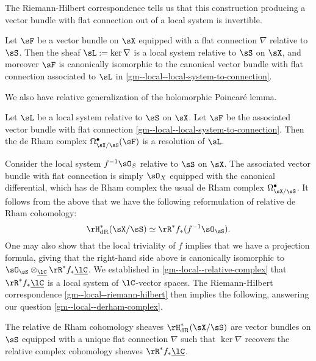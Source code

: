 The Riemann-Hilbert correspondence tells us that this construction producing a vector bundle with flat connection out of a local system is invertible.

\begin{theorem}
  \label{gm--local--riemann-hilbert}
  Let $\sF$ be a vector bundle on $\sX$ equipped with a flat connection $\nabla$ relative to $\sS$. Then the sheaf $\sL \ce \ker \nabla$ is a local system relative to $\sS$ on $\sX$, and moreover $\sF$ is canonically isomorphic to the canonical vector bundle with flat connection associated to $\sL$ in \cref{gm--local--local-system-to-connection}.
\end{theorem}

We also have relative generalization of the holomorphic Poincar\'e lemma.

\begin{proposition}
  \label{gm--local--poincare}
  Let $\sL$ be a local system relative to $\sS$ on $\sX$. Let $\sF$ be the associated vector bundle with flat connection \cref{gm--local--local-system-to-connection}. Then the de Rham complex $\Omega_{\sX/\sS}^\bullet(\sF)$ is a resolution of $\sL$.
\end{proposition}

\begin{nothing}
  \label{gm--local--final}
  Consider the local system $f^{-1}\sO_S$ relative to $\sS$ on $\sX$. The associated vector bundle with flat connection is simply $\sO_X$ equipped with the canonical differential, which has de Rham complex the usual de Rham complex $\Omega_{\sX/\sS}^\bullet$. It follows from the above that we have the following reformulation of relative de Rham cohomology:
  \[
    \rH_{\dR}^*(\sX/\sS) \iso \rR^*f_*(f^{-1}\sO_\sS).
  \]
  One may also show that the local triviality of $f$ implies that we have a projection formula, giving that the right-hand side above is canonically isomorphic to $\sO_\sS \otimes_{\u\lC} \rR^*f_*\u\lC$. We established in \cref{gm--local--relative-complex} that $\rR^*f_*\u\lC$ is a local system of $\lC$-vector spaces. The Riemann-Hilbert correspondence \cref{gm--local--riemann-hilbert} then implies the following, answering our question \cref{gm--local--derham-complex}.
\end{nothing}

\begin{proposition}
  \label{gm--local--gm-existence}
  The relative de Rham cohomology sheaves $\rH_\dR^*(\sX/\sS)$ are vector bundles on $\sS$ equipped with a unique flat connection $\nabla$ such that $\ker \nabla$ recovers the relative complex cohomology sheaves $\rR^*f_*\u\lC$.
\end{proposition}

